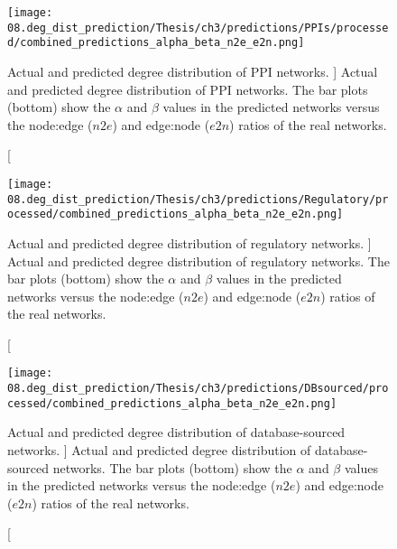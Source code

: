     	\begin{figure}[H]%
    			\centering
    					\texttt{[image: 08.deg\_dist\_prediction/Thesis/ch3/predictions/PPIs/processed/combined\_predictions\_alpha\_beta\_n2e\_e2n.png]}
    					\caption
                            [
                                Actual and predicted degree distribution of PPI networks.
                            ]
                            {
                                Actual and predicted degree distribution of PPI networks. The bar plots (bottom) show the $\alpha$ and $\beta$ values in the predicted networks versus the node:edge ($n2e$) and edge:node ($e2n$) ratios of the real networks.
                            }
    					\label{fig:predictions_PPIs}
    	\end{figure}

        \begin{figure}[H]%
                \centering
                        \texttt{[image: 08.deg\_dist\_prediction/Thesis/ch3/predictions/Regulatory/processed/combined\_predictions\_alpha\_beta\_n2e\_e2n.png]}
                        \caption
                            [
                                Actual and predicted degree distribution of regulatory networks.
                            ]
                            {
                                Actual and predicted degree distribution of regulatory networks. The bar plots (bottom) show the $\alpha$ and $\beta$ values in the predicted networks versus the node:edge ($n2e$) and edge:node ($e2n$) ratios of the real networks.
                            }
                        \label{fig:predictions_Regulatory}
        \end{figure}

        \begin{figure}[H]%
                \centering
                        \texttt{[image: 08.deg\_dist\_prediction/Thesis/ch3/predictions/DBsourced/processed/combined\_predictions\_alpha\_beta\_n2e\_e2n.png]}
                        \caption
                        [
                            Actual and predicted degree distribution of database-sourced networks.
                        ]
                        {
                            Actual and predicted degree distribution of database-sourced networks. The bar plots (bottom) show the $\alpha$ and $\beta$ values in the predicted networks versus the node:edge ($n2e$) and edge:node ($e2n$) ratios of the real networks.
                        }
                        \label{fig:predictions_DBsourced}
        \end{figure}

\printbibliography

